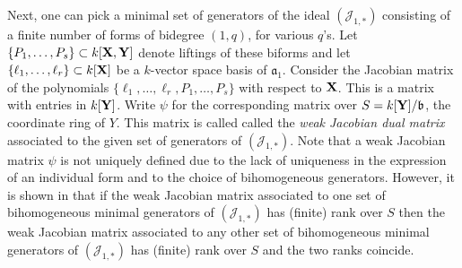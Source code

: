 \documentclass[11pt]{amsart}
\numberwithin{equation}{theorem}
\def\XX{{\bf X}}
\def\YY{{\bf Y}}
\renewcommand{\:}{\colon}
\theoremstyle{theorem}
\begin{document}
Next, one can pick a minimal set of generators of the ideal $({\mathcal J}_{1,*})$ consisting of a finite number
of forms of bidegree $(1,q)$, for various $q$'s.
Let $\{P_1,\ldots,P_s\}\subset k[\XX,\YY]$ denote liftings of these biforms and let $\{\ell_1,\ldots,\ell_r\}\subset k[\XX]$ be  a $k$-vector space
basis of ${\mathfrak a}_1$.
Consider the Jacobian matrix of the polynomials $\{\ell_1,\ldots,\ell_r, P_1,\ldots,P_s\}$ with respect to $\XX$. This is a matrix with entries in $k[\YY]$.
Write $\psi$ for the corresponding matrix over $S=k[\YY]/{\mathfrak b}$, the coordinate ring of $Y$. This matrix is called  called the \emph{weak Jacobian dual matrix}  associated to
the given set of generators of $({\mathcal J}_{1,*})$.
Note that a weak Jacobian matrix $\psi$ is not uniquely defined due to the lack of uniqueness in the expression of
an individual form and to the choice of bihomogeneous generators. However, it is shown in \cite[Lemma 2.13]{DoriaHassanzadehSimisBirationality} that if the weak Jacobian matrix associated  to one set of bihomogeneous minimal generators of
$({\mathcal J}_{1,*})$ has (finite) rank over $S$ then the weak Jacobian matrix associated to any other
set of bihomogeneous minimal generators of
$({\mathcal J}_{1,*})$ has (finite) rank over $S$ and the two ranks coincide.
\end{document}
